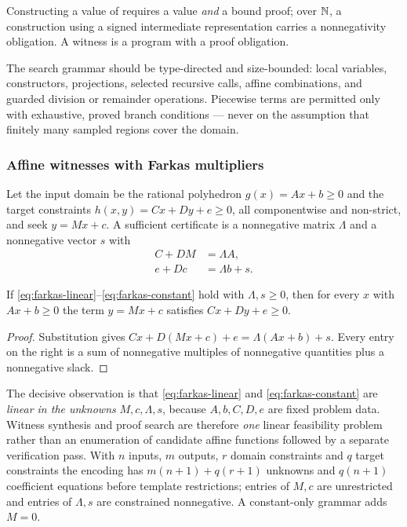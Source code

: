 Constructing a value of  requires a value \emph{and} a bound proof;
over $\mathbb{N}$, a construction using a signed intermediate representation carries a
nonnegativity obligation. A witness is a program with a proof obligation.

The search grammar should be type-directed and size-bounded: local variables,
constructors, projections, selected recursive calls, affine combinations, and
guarded division or remainder operations. Piecewise terms are permitted only
with exhaustive, proved branch conditions --- never on the assumption that
finitely many sampled regions cover the domain.

\subsubsection*{Affine witnesses with Farkas multipliers}
\label{sec:affine-witness}

Let the input domain be the rational polyhedron $g(x)=Ax+b\ge0$ and the target
constraints $h(x,y)=Cx+Dy+e\ge0$, all componentwise and non-strict, and seek
$y=Mx+c$. A sufficient certificate is a nonnegative matrix $\Lambda$ and a
nonnegative vector $s$ with
\begin{align}
C+DM&=\Lambda A,\label{eq:farkas-linear}\\
e+Dc&=\Lambda b+s.\label{eq:farkas-constant}
\end{align}

\begin{proposition}
If \eqref{eq:farkas-linear}--\eqref{eq:farkas-constant} hold with
$\Lambda,s\ge0$, then for every $x$ with $Ax+b\ge0$ the term $y=Mx+c$ satisfies
$Cx+Dy+e\ge0$.
\end{proposition}
\begin{proof}
Substitution gives $Cx+D(Mx+c)+e=\Lambda(Ax+b)+s$. Every entry on the right is a
sum of nonnegative multiples of nonnegative quantities plus a nonnegative slack.
\end{proof}

The decisive observation is that \eqref{eq:farkas-linear} and
\eqref{eq:farkas-constant} are \emph{linear in the unknowns} $M,c,\Lambda,s$,
because $A,b,C,D,e$ are fixed problem data. Witness synthesis and proof search
are therefore \emph{one} linear feasibility problem rather than an enumeration
of candidate affine functions followed by a separate verification pass. With $n$
inputs, $m$ outputs, $r$ domain constraints and $q$ target constraints the
encoding has $m(n+1)+q(r+1)$ unknowns and $q(n+1)$ coefficient equations before
template restrictions; entries of $M,c$ are unrestricted and entries of
$\Lambda,s$ are constrained nonnegative. A constant-only grammar adds $M=0$.

